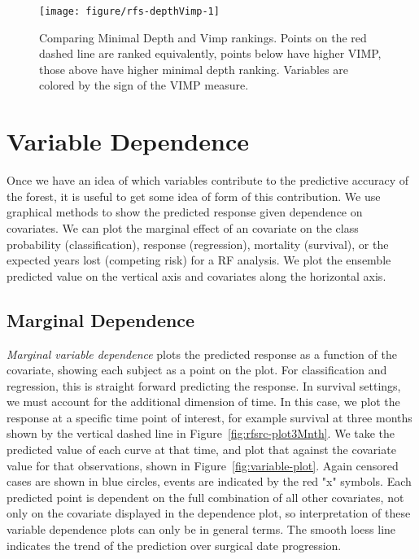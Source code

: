 \documentclass[nojss]{jss}\usepackage[]{graphicx}\usepackage[]{color}
\begin{document}
\begin{Schunk}
\begin{figure}[!htpb]

{\centering \texttt{[image: figure/rfs-depthVimp-1]} 

}

\caption[Comparing Minimal Depth and Vimp rankings]{Comparing Minimal Depth and Vimp rankings. Points on the red dashed line are ranked equivalently, points below have higher VIMP, those above have higher minimal depth ranking. Variables are colored by the sign of the VIMP measure.\label{fig:depthVimp}}
\end{figure}
\end{Schunk}

\section{Variable Dependence}\label{S:dependence}
Once we have an idea of which variables contribute to the predictive accuracy of the forest, it is useful to get some idea of form of this contribution. We use graphical methods to show the predicted response given dependence on covariates. We can plot the marginal effect of an covariate on the class probability (classification), response (regression), mortality (survival), or the expected years lost (competing risk) for a RF analysis. We plot the ensemble predicted value on the vertical axis and covariates along the horizontal axis.

\subsection{Marginal Dependence}\label{S:variabledependence}
\emph{Marginal variable dependence} plots the predicted response as a function of the covariate, showing each subject as a point on the plot. For classification and regression, this is straight forward predicting the response. In survival settings, we must account for the additional dimension of time. In this case, we plot the response at a specific time point of interest, for example survival at three months shown by the vertical dashed line in Figure~\ref{fig:rfsrc-plot3Mnth}. We take the predicted value of each curve at that time, and plot that against the covariate value for that observations, shown in Figure~\ref{fig:variable-plot}. Again censored cases are shown in blue circles, events are indicated by the red "x" symbols. Each predicted point is dependent on the full combination of all other covariates, not only on the covariate displayed in the dependence plot, so interpretation of these variable dependence plots can only be in general terms. The smooth loess line~\citep{cleveland:1981, cleveland:1988} indicates the trend of the prediction over surgical date progression.
\end{document}
